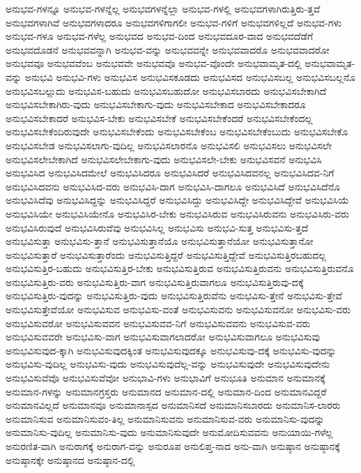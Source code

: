{ಅನುಭವ-ಗಳನ್ನೂ
ಅನುಭವ-ಗಳನ್ನೆಲ್ಲ
ಅನುಭವಗಳನ್ನೆಲ್ಲಾ
ಅನುಭವ-ಗಳಲ್ಲಿ
ಅನುಭವಗಳಾಗಿರುತ್ತಿರು-ತ್ತವೆ
ಅನುಭವಗಳಾಗಿವೆ
ಅನುಭವಗಳಾದರೂ
ಅನುಭವಗಳಿಗಾಗಲೀ
ಅನುಭವ-ಗಳಿಗೆ
ಅನುಭವಗಳಿಲ್ಲದೆ
ಅನುಭವ-ಗಳು
ಅನುಭವ-ಗಳೂ
ಅನುಭವ-ಗಳೆಲ್ಲ
ಅನುಭವದ
ಅನುಭವ-ದಿಂದ
ಅನುಭವದೂರ-ವಾದ
ಅನುಭವದೆಡೆಗೆ
ಅನುಭವದೊಡನೆ
ಅನುಭವವನ್ನಾಗಿ
ಅನುಭವ-ವನ್ನು
ಅನುಭವವನ್ನೇ
ಅನುಭವವಾದರೊ
ಅನುಭವವಾದರೋ
ಅನುಭವವೂ
ಅನುಭವವೆಂಬ
ಅನುಭವವೇ
ಅನುಭವವೊ
ಅನುಭವ-ವೊಂದೇ
ಅನುಭವಾಮೃತ-ದಲ್ಲಿ
ಅನುಭವಾಮೃತ-ವನ್ನು
ಅನುಭವಿ
ಅನುಭವಿ-ಗಳು
ಅನುಭವಿಸ
ಅನುಭವಿಸಕೂಡದು
ಅನುಭವಿಸದ
ಅನುಭವಿಸಬಲ್ಲ
ಅನುಭವಿಸಬಲ್ಲನೊ
ಅನುಭವಿಸಬಲ್ಲುದು
ಅನುಭವಿಸ-ಬಹುದು
ಅನುಭವಿಸಬಹುದೋ
ಅನುಭವಿಸಬಾರದು
ಅನುಭವಿಸಬೇಕಾಗಿದೆ
ಅನುಭವಿಸಬೇಕಾಗಿರು-ವುದು
ಅನುಭವಿಸಬೇಕಾಗು-ವುದು
ಅನುಭವಿಸಬೇಕಾದ
ಅನುಭವಿಸಬೇಕಾದರೂ
ಅನುಭವಿಸಬೇಕಾದರೆ
ಅನುಭವಿಸ-ಬೇಕು
ಅನುಭವಿಸಬೇಕೆ
ಅನುಭವಿಸಬೇಕೆಂದರೆ
ಅನುಭವಿಸಬೇಕೆಂದಲ್ಲ
ಅನುಭವಿಸಬೇಕೆಂದಿರುವುದೇ
ಅನುಭವಿಸಬೇಕೆಂದು
ಅನುಭವಿಸಬೇಕೆಂಬ
ಅನುಭವಿಸಬೇಕೆಂಬುದು
ಅನುಭವಿಸಬೇಕೊ
ಅನುಭವಿಸಬೇಡ
ಅನುಭವಿಸಲಾಗು-ವುದಿಲ್ಲ
ಅನುಭವಿಸಲಾರನೊ
ಅನುಭವಿಸಲಿ
ಅನುಭವಿಸಲು
ಅನುಭವಿಸಲೇ
ಅನುಭವಿಸಲೇಬೇಕಾಗಿದೆ
ಅನುಭವಿಸಲೇಬೇಕಾಗು-ವುದು
ಅನುಭವಿಸಲೇ-ಬೇಕು
ಅನುಭವಿಸವನೆ
ಅನುಭವಿಸಿ
ಅನುಭವಿಸಿದ
ಅನುಭವಿಸಿದಮೇಲೆ
ಅನುಭವಿಸಿದರೂ
ಅನುಭವಿಸಿದರೆ
ಅನುಭವಿಸಿದವನಲ್ಲ
ಅನುಭವಿಸಿದವ-ನಿಗೆ
ಅನುಭವಿಸಿದವನು
ಅನುಭವಿಸಿದ-ವರು
ಅನುಭವಿಸಿ-ದಾಗ
ಅನುಭವಿಸಿ-ದಾಗಲೂ
ಅನುಭವಿಸಿದೆ
ಅನುಭವಿಸಿದೆನೊ
ಅನುಭವಿಸಿದೆವು
ಅನುಭವಿಸಿದ್ದನ್ನು
ಅನುಭವಿಸಿದ್ದರೆ
ಅನುಭವಿಸಿದ್ದು
ಅನುಭವಿಸಿದ್ದೇ
ಅನುಭವಿಸಿದ್ದೇವೆ
ಅನುಭವಿಸಿಯೆ
ಅನುಭವಿಸಿಯೇ
ಅನುಭವಿಸಿಯೇನೊ
ಅನುಭವಿಸಿರ-ಬೇಕು
ಅನುಭವಿಸಿರುವ
ಅನುಭವಿಸಿರುವನು
ಅನುಭವಿಸಿರು-ವರು
ಅನುಭವಿಸಿರುವುದೆ
ಅನುಭವಿಸಿರುವೆವು
ಅನುಭವಿಸಿಲ್ಲ
ಅನುಭವಿಸು
ಅನುಭವಿ-ಸುತ್ತ
ಅನುಭವಿಸು-ತ್ತದೆ
ಅನುಭವಿಸುತ್ತಾ
ಅನುಭವಿಸು-ತ್ತಾನೆ
ಅನುಭವಿಸುತ್ತಾನೆಯೊ
ಅನುಭವಿಸುತ್ತಾನೆಯೋ
ಅನುಭವಿಸುತ್ತಾನೋ
ಅನುಭವಿಸುತ್ತಾರೆ
ಅನುಭವಿಸುತ್ತಾರೆಂದು
ಅನುಭವಿಸುತ್ತಿದ್ದರೆ
ಅನುಭವಿಸುತ್ತಿದ್ದೇವೆ
ಅನುಭವಿಸುತ್ತಿರಬಹುದಲ್ಲ
ಅನುಭವಿಸುತ್ತಿರ-ಬಹುದು
ಅನುಭವಿಸುತ್ತಿರ-ಬೇಕು
ಅನುಭವಿಸುತ್ತಿರುವ
ಅನುಭವಿಸುತ್ತಿರುವನು
ಅನುಭವಿಸುತ್ತಿರುವನೊ
ಅನುಭವಿಸುತ್ತಿರು-ವರು
ಅನುಭವಿಸುತ್ತಿರು-ವಾಗ
ಅನುಭವಿಸುತ್ತಿರುವಾಗಲೂ
ಅನುಭವಿಸುತ್ತಿರುವು-ದಕ್ಕೆ
ಅನುಭವಿಸುತ್ತಿರು-ವುದನ್ನು
ಅನುಭವಿಸುತ್ತಿರು-ವುದು
ಅನುಭವಿಸುತ್ತಿರುವೆನು
ಅನುಭವಿಸು-ತ್ತೇನೆ
ಅನುಭವಿಸು-ತ್ತೇವೆ
ಅನುಭವಿಸುತ್ತೇವೆಯೋ
ಅನುಭವಿಸುವ
ಅನುಭವಿಸು-ವಂತೆ
ಅನುಭವಿಸುವನು
ಅನುಭವಿಸುವನೋ
ಅನುಭವಿಸು-ವರು
ಅನುಭವಿಸುವರೋ
ಅನುಭವಿಸುವವನ
ಅನುಭವಿಸುವವ-ನಿಗೆ
ಅನುಭವಿಸುವವನು
ಅನುಭವಿಸುವ-ವರು
ಅನುಭವಿಸುವವರೇ
ಅನುಭವಿಸು-ವಾಗ
ಅನುಭವಿಸುವಾಗಲಾದರೋ
ಅನುಭವಿಸುವಾಗಲೂ
ಅನುಭವಿಸುವು
ಅನುಭವಿಸುವುದ-ಕ್ಕಾಗಿ
ಅನುಭವಿಸುವುದಕ್ಕಿಂತ
ಅನುಭವಿಸುವುದಕ್ಕೂ
ಅನುಭವಿಸುವು-ದಕ್ಕೆ
ಅನುಭವಿಸು-ವುದನ್ನು
ಅನುಭವಿಸು-ವುದಿಲ್ಲ
ಅನುಭವಿಸು-ವುದು
ಅನುಭವಿಸುವುದೆಲ್ಲ-ವನ್ನು
ಅನುಭವಿಸುವುದೇ
ಅನುಭವಿಸುವುದೇನು
ಅನುಭವಿಸುವೆವೊ
ಅನುಭವಿಸುವೆವೋ
ಅನುಭಾವಿ-ಗಳು
ಅನುಭಾವಿಗೆ
ಅನುಭೂತಿ
ಅನುಮಾನ
ಅನುಮಾನಕ್ಕೆ
ಅನುಮಾನ-ಗಳನ್ನು
ಅನುಮಾನಗ್ರಸ್ತರು
ಅನುಮಾನದ
ಅನುಮಾನ-ದಲ್ಲಿ
ಅನುಮಾನ-ದಿಂದ
ಅನುಮಾನವಿದ್ದರೆ
ಅನುಮಾನವಿಲ್ಲದೆ
ಅನುಮಾನವೂ
ಅನುಮಾನಾಸ್ಪದ
ಅನುಮಾನಿಸದೆ
ಅನುಮಾನಿಸಬಾರದು
ಅನುಮಾನಿಸ-ಲಾರರು
ಅನುಮಾನಿಸುವ
ಅನುಮಾನಿಸುವಂ-ತಿಲ್ಲ
ಅನುಮಾನಿಸುವನು
ಅನುಮಾನಿಸುವ-ವರು
ಅನುಮಾನಿಸು-ವುದನ್ನು
ಅನುಮಾನಿಸು-ವುದಿಲ್ಲ
ಅನುಮಾನಿಸು-ವುದು
ಅನುಮಾನಿಸುವುದೇ
ಅನುಮೋದಿಸುವವನು
ಅನುಯಾಯಿ-ಗಳೆಲ್ಲ
ಅನುರಣಿತ-ವಾಗಿ
ಅನುರಾಗಕ್ಕೆ
ಅನುರಾಗ-ವನ್ನು
ಅನುರೂಪ
ಅನುಲಿಪ್ತ-ನಾದ
ಅನು-ವಾಗಿ
ಅನುಷ್ಠಾನ
ಅನುಷ್ಠಾನಕ್ಕೆ
ಅನುಷ್ಠಾನಕ್ಕೇ
ಅನುಷ್ಠಾನದ
ಅನುಷ್ಠಾನ-ದಲ್ಲಿ
}
